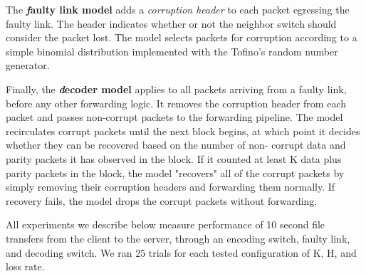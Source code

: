 The \textbf{\emph faulty link model} adds a \emph{corruption header} to each packet
egressing the faulty link. The header indicates whether or not the neighbor
switch should consider the packet lost. The model selects packets for
corruption according to a simple binomial distribution implemented with the
Tofino's random number generator.

Finally, the \textbf{\emph decoder model} applies to all packets arriving from a
faulty link, before any other forwarding logic. It removes the corruption
header from each packet and passes non-corrupt packets to the forwarding
pipeline. The model recirculates corrupt packets until the next block begins,
at which point it decides whether they can be recovered based on the number of
non- corrupt data and parity packets it has observed in the block. If it
counted at least K data plus parity packets  in the block, the model
"recovers" all of the corrupt packets by simply removing their corruption
headers and forwarding them normally. If recovery fails, the model drops the
corrupt packets without forwarding.

All experiments we describe below measure performance of 10 second file
transfers from the client to the server, through an encoding switch, faulty
link, and decoding switch. We ran 25 trials for each tested configuration of
K, H,  and loss rate.


